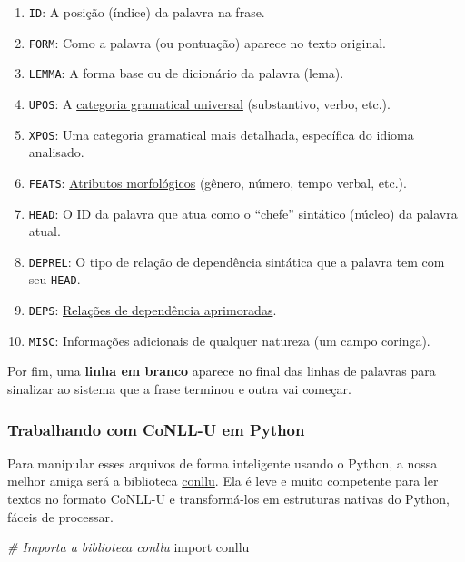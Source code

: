 \documentclass[
  brazilian,
]{article}
\newenvironment{Shaded}{}{}
\newcommand{\CommentTok}[1]{\textcolor[rgb]{0.38,0.63,0.69}{\textit{#1}}}
\newcommand{\ImportTok}[1]{#1}
\newcommand{\NormalTok}[1]{#1}
\providecommand{\tightlist}{%
  \setlength{\itemsep}{0pt}\setlength{\parskip}{0pt}}
\begin{document}
\begin{enumerate}
\def\labelenumi{\arabic{enumi}.}
\tightlist
\item
  \texttt{ID}: A posição (índice) da palavra na frase.
\item
  \texttt{FORM}: Como a palavra (ou pontuação) aparece no texto
  original.
\item
  \texttt{LEMMA}: A forma base ou de dicionário da palavra (lema).
\item
  \texttt{UPOS}: A
  \href{https://universaldependencies.org/u/pos/}{categoria gramatical
  universal} (substantivo, verbo, etc.).
\item
  \texttt{XPOS}: Uma categoria gramatical mais detalhada, específica do
  idioma analisado.
\item
  \texttt{FEATS}:
  \href{https://universaldependencies.org/u/feat/index.html}{Atributos
  morfológicos} (gênero, número, tempo verbal, etc.).
\item
  \texttt{HEAD}: O ID da palavra que atua como o ``chefe'' sintático
  (núcleo) da palavra atual.
\item
  \texttt{DEPREL}: O tipo de relação de dependência sintática que a
  palavra tem com seu \texttt{HEAD}.
\item
  \texttt{DEPS}:
  \href{https://universaldependencies.org/u/overview/enhanced-syntax.html}{Relações
  de dependência aprimoradas}.
\item
  \texttt{MISC}: Informações adicionais de qualquer natureza (um campo
  coringa).
\end{enumerate}

Por fim, uma \textbf{linha em branco} aparece no final das linhas de
palavras para sinalizar ao sistema que a frase terminou e outra vai
começar.

\hypertarget{trabalhando-com-conll-u-em-python}{%
\subsubsection{Trabalhando com CoNLL-U em
Python}\label{trabalhando-com-conll-u-em-python}}

Para manipular esses arquivos de forma inteligente usando o Python, a
nossa melhor amiga será a biblioteca
\href{https://github.com/EmilStenstrom/conllu/}{conllu}. Ela é leve e
muito competente para ler textos no formato CoNLL-U e transformá-los em
estruturas nativas do Python, fáceis de processar.

\begin{Shaded}
\begin{Highlighting}[]
\CommentTok{\# Importa a biblioteca conllu}
\ImportTok{import}\NormalTok{ conllu}
\end{Highlighting}
\end{Shaded}
\end{document}
